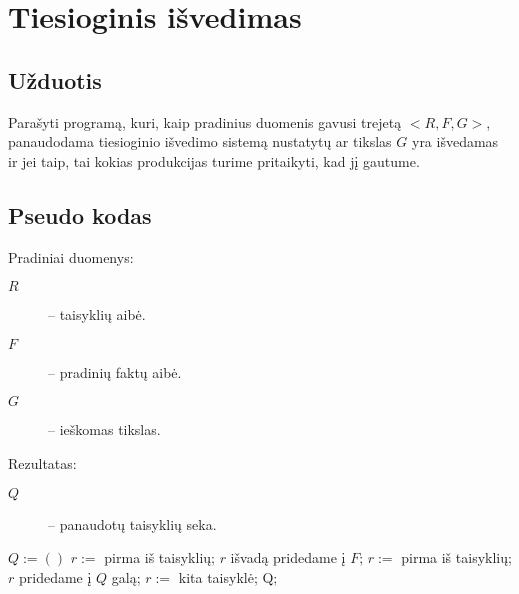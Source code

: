 \chapter{Tiesioginis išvedimas}

\section{Užduotis}

Parašyti programą, kuri, kaip pradinius duomenis gavusi trejetą
$<R, F, G>$, panaudodama tiesioginio išvedimo sistemą nustatytų
ar tikslas $G$ yra išvedamas ir jei taip, tai kokias produkcijas
turime pritaikyti, kad jį gautume.

\section{Pseudo kodas}

\label{sec:fc:pseudo}

Pradiniai duomenys:
\begin{description}
  \item[$R$] – taisyklių aibė.
  \item[$F$] – pradinių faktų aibė.
  \item[$G$] – ieškomas tikslas.
\end{description}

Rezultatas:
\begin{description}
  \item[$Q$] – panaudotų taisyklių seka.
\end{description}

\begin{algorithmic}[1]
    \State $Q := \left(  \right)$
    \State $r :=$ pirma iš taisyklių;
                                        \label{fc:pseudo:while_condition}
                                        \label{fc:pseudo:if_condition}
        \State $r$ išvadą pridedame į $F$;
                                        \label{fc:pseudo:add_fact}
        \State $r := $ pirma iš taisyklių;
                                        \label{fc:pseudo:start}
        \State $r$ pridedame į $Q$ galą;
                                        \label{fc:pseudo:add_rule}
      \Else
        \State $r := $ kita taisyklė;   \label{fc:pseudo:next_rule}
      \EndIf
    \EndWhile
    \State \Return Q;
  \EndFunction
\end{algorithmic}


